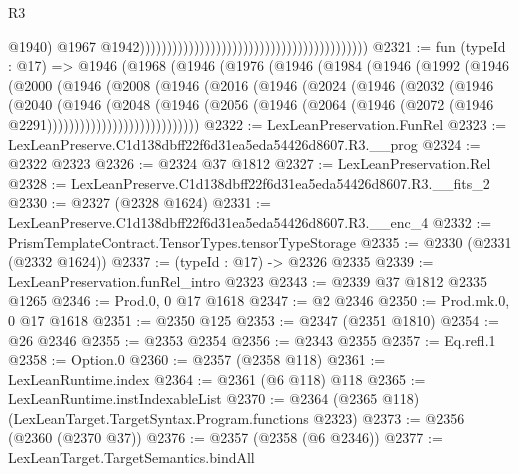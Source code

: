 \begin{lexlean}{R3}
\begin{coremodule}
                                                                                          @1940)
                                                                                        @1967
                                                                                        @1942))))))))))))))))))))))))))))))))))))))))))
@2321 := fun (typeId : @17) =>
  @1946
    (@1968
      (@1946
        (@1976
          (@1946
            (@1984
              (@1946
                (@1992
                  (@1946
                    (@2000
                      (@1946
                        (@2008
                          (@1946
                            (@2016
                              (@1946
                                (@2024
                                  (@1946
                                    (@2032
                                      (@1946
                                        (@2040
                                          (@1946
                                            (@2048
                                              (@1946
                                                (@2056
                                                  (@1946
                                                    (@2064
                                                      (@1946
                                                        (@2072
                                                          (@1946 @2291))))))))))))))))))))))))))))
@2322 := LexLeanPreservation.FunRel
@2323 := LexLeanPreserve.C1d138dbff22f6d31ea5eda54426d8607.R3.__prog
@2324 := @2322 @2323
@2326 := @2324 @37 @1812
@2327 := LexLeanPreservation.Rel
@2328 := LexLeanPreserve.C1d138dbff22f6d31ea5eda54426d8607.R3.__fits_2
@2330 := @2327 (@2328 @1624)
@2331 := LexLeanPreserve.C1d138dbff22f6d31ea5eda54426d8607.R3.__enc_4
@2332 := PrismTemplateContract.TensorTypes.tensorTypeStorage
@2335 := @2330 (@2331 (@2332 @1624))
@2337 := (typeId : @17) -> @2326 @2335
@2339 := LexLeanPreservation.funRel_intro @2323
@2343 := @2339 @37 @1812 @2335 @1265
@2346 := Prod.{0, 0} @17 @1618
@2347 := @2 @2346
@2350 := Prod.mk.{0, 0} @17 @1618
@2351 := @2350 @125
@2353 := @2347 (@2351 @1810)
@2354 := @26 @2346
@2355 := @2353 @2354
@2356 := @2343 @2355
@2357 := Eq.refl.{1}
@2358 := Option.{0}
@2360 := @2357 (@2358 @118)
@2361 := LexLeanRuntime.index
@2364 := @2361 (@6 @118) @118
@2365 := LexLeanRuntime.instIndexableList
@2370 := @2364 (@2365 @118) (LexLeanTarget.TargetSyntax.Program.functions @2323)
@2373 := @2356 (@2360 (@2370 @37))
@2376 := @2357 (@2358 (@6 @2346))
@2377 := LexLeanTarget.TargetSemantics.bindAll

\end{coremodule}
\end{lexlean}
